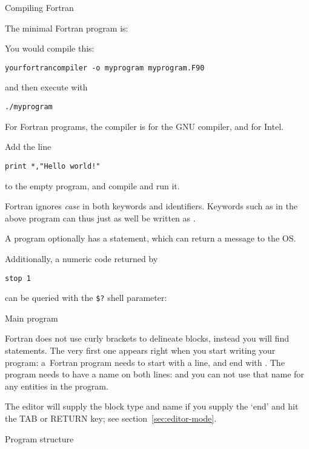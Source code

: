  {Compiling Fortran}

The minimal Fortran program is:
%

You would compile this:
\begin{verbatim}
yourfortrancompiler -o myprogram myprogram.F90
\end{verbatim}
and then execute with 
\begin{verbatim}
./myprogram
\end{verbatim}
For Fortran programs, the compiler is  for the
GNU compiler, and  for Intel. 

\begin{exercise}
  Add the line
\begin{lstlisting}
print *,"Hello world!"
\end{lstlisting}
to the empty program, and compile and run it.
\end{exercise}

Fortran ignores \emph{case}
in both keywords and identifiers.
Keywords such as  in the above program
can thus just as well be written as
.

A program optionally has a  statement, which can
return a message to the \ac{OS}.
%

Additionally, a numeric code returned by 
\begin{lstlisting}
stop 1
\end{lstlisting}
can be queried with the \verb+$?+ shell parameter:
%

 {Main program}

Fortran does not use curly brackets to delineate blocks, instead you
will find  statements. The very first one appears
right when you start writing your program:
a~Fortran program needs to start with a  line, and end with
. The program needs to have a name on both lines:
%
%
and you can not use that name for any entities in the program.

\begin{remark}
  The  editor will supply the block type and name if
  you supply the `end' and hit the TAB or RETURN key; see
  section~\ref{sec:editor-mode}.
\end{remark}

 {Program structure}

